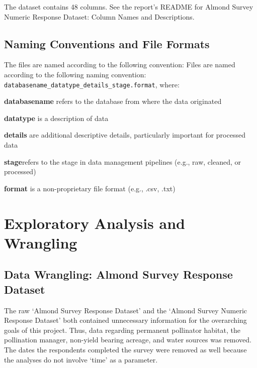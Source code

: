 \documentclass[12pt,]{article}
\begin{document}
The dataset contains 48 columns. See the report's README for Almond
Survey Numeric Response Dataset: Column Names and Descriptions.

\subsection{Naming Conventions and File
Formats}\label{naming-conventions-and-file-formats}

The files are named according to the following convention: Files are
named according to the following naming convention:
\texttt{databasename\_datatype\_details\_stage.format}, where:

\textbf{databasename} refers to the database from where the data
originated

\textbf{datatype} is a description of data

\textbf{details} are additional descriptive details, particularly
important for processed data

\textbf{stage}refers to the stage in data management pipelines (e.g.,
raw, cleaned, or processed)

\textbf{format} is a non-proprietary file format (e.g., .csv, .txt)

\newpage

\section{Exploratory Analysis and
Wrangling}\label{exploratory-analysis-and-wrangling}

\subsection{Data Wrangling: Almond Survey Response
Dataset}\label{data-wrangling-almond-survey-response-dataset}

The raw `Almond Survey Response Dataset' and the `Almond Survey Numeric
Response Dataset' both contained unnecessary information for the
overarching goals of this project. Thus, data regarding permanent
pollinator habitat, the pollination manager, non-yield bearing acreage,
and water sources was removed. The dates the respondents completed the
survey were removed as well because the analyses do not involve `time'
as a parameter.
\end{document}

